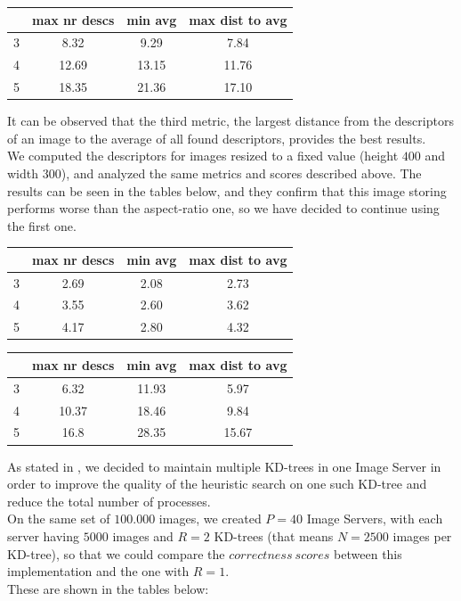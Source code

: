 \documentclass[conference]{IEEEtran}
\begin{document}
\begin{tabular} {c | c | c | c}
	& max nr descs & min avg & max dist to avg \\
	\hline
	3 & 8.32 & 9.29 & 7.84 \\
	\hline
	4 & 12.69 & 13.15 & 11.76 \\
	\hline
	5 & 18.35 & 21.36 & 17.10 \\
\end{tabular}

It can be observed that the third metric, the largest distance from the descriptors of an image to the average of all found descriptors, provides the best results.\\

We computed the descriptors for images resized to a fixed value (height $400$ and width $300$), and analyzed the same metrics and scores described above. The results can be seen in the tables below,
and they confirm that this image storing performs worse than the aspect-ratio one, so we have decided to continue using the first one.\\

\begin{tabular} {c | c | c | c}
	& max nr descs & min avg & max dist to avg \\
	\hline
	3 & 2.69 & 2.08 & 2.73 \\
	\hline
	4 & 3.55 & 2.60 & 3.62 \\
	\hline
	5 & 4.17 & 2.80 & 4.32 \\
\end{tabular}

\begin{tabular} {c | c | c | c}
	& max nr descs & min avg & max dist to avg \\
	\hline
	3 & 6.32 & 11.93 & 5.97 \\
	\hline
	4 & 10.37 & 18.46 & 9.84 \\
	\hline
	5 & 16.8 & 28.35 & 15.67 \\
\end{tabular}

As stated in , we decided to maintain multiple KD-trees in one Image Server in order to improve the quality of the heuristic search on one such KD-tree and reduce the total number of processes.\\
On the same set of $100.000$ images, we created $P=40$ Image Servers, with each server having $5000$ images and $R=2$ KD-trees (that means $N=2500$ images per KD-tree), so that we could compare the $correctness\ scores$ between this implementation and the one with $R=1$.\\
These are shown in the tables below:\\
\end{document}
